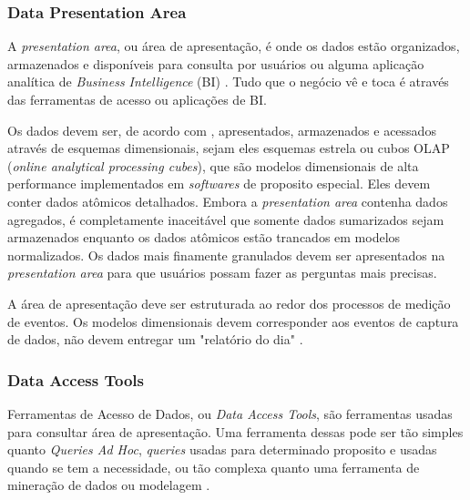 \subsubsection{Data Presentation Area}
A \textit{presentation area}, ou área de apresentação, é onde os dados estão organizados, armazenados e disponíveis para consulta por usuários ou alguma aplicação analítica de \textit{Business Intelligence} (BI) \citep{kimball2013}. Tudo que o negócio vê e toca é através das ferramentas de acesso ou aplicações de BI.

Os dados devem ser, de acordo com , apresentados, armazenados e acessados através de esquemas dimensionais, sejam eles esquemas estrela ou cubos OLAP (\textit{online analytical processing cubes}), que são modelos dimensionais de alta performance implementados em \textit{softwares} de proposito especial. Eles devem conter dados atômicos detalhados. Embora a \textit{presentation area} contenha dados agregados, é completamente inaceitável que somente dados sumarizados sejam armazenados enquanto os dados atômicos estão trancados em modelos normalizados. Os dados mais finamente granulados devem ser apresentados na \textit{presentation area} para que usuários possam fazer as perguntas mais precisas.

A área de apresentação deve ser estruturada ao redor dos processos de medição de eventos. Os modelos dimensionais devem corresponder aos eventos de captura de dados, não devem entregar um "relatório do dia" \citep{jmj}. 

\subsubsection{Data Access Tools} Ferramentas de Acesso de Dados, ou \textit{Data Access Tools}, são ferramentas usadas para consultar área de apresentação. Uma ferramenta dessas pode ser tão simples quanto \textit{Queries Ad Hoc}, \textit{queries} usadas para determinado proposito e usadas quando se tem a necessidade, ou tão complexa quanto uma ferramenta de mineração de dados ou modelagem \citep{kimball2013}. 

